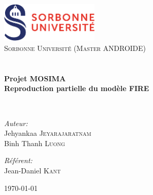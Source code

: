 
\begin{titlepage}
\begin{center}

\includegraphics[width=0.35\textwidth]{./images/logo}~\\[1cm]

\textsc{\LARGE Sorbonne Université (Master ANDROIDE)}\\[1.5cm]

\textsc{\Large }\\[0.5cm]

\HRule \\[0.4cm]

{\huge \bfseries Projet MOSIMA\\
Reproduction partielle du modèle FIRE \\[0.4cm] }

\HRule \\[1.5cm]

\begin{minipage}{0.4\textwidth}
\begin{flushleft} \large
\emph{Auteur:}\\
Jehyankaa \textsc{Jeyarajaratnam}\\
Binh Thanh \textsc{Luong}
\end{flushleft}
\end{minipage}
\begin{minipage}{0.4\textwidth}
\begin{flushright} \large
\emph{Référent:} \\
Jean-Daniel \textsc{Kant}
\end{flushright}
\end{minipage}

\vfill

{\large \today}

\end{center}
\end{titlepage}
